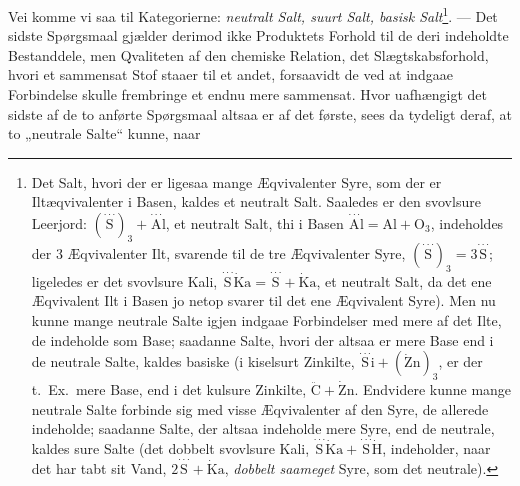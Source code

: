 \documentclass[12pt,a4paper]{book}
\begin{document}
Vei komme vi saa til Kategorierne: \emph{neutralt Salt,
suurt Salt, basisk Salt}\footnote{Det Salt, hvori der er ligesaa
mange Æqvivalenter Syre, som
der er Iltæqvivalenter i Basen, kaldes et neutralt Salt. Saaledes
er den svovlsure Leerjord:
$(\stackrel{\cdot\cdot\cdot}{\mathrm{S}})_3 +
\stackrel{\cdot\cdot\cdot}{\mathrm{A}}\mathrm{l}$, et neutralt Salt, thi
i Basen $\stackrel{\cdot\cdot\cdot}{\mathrm{A}}\mathrm{l} =
\mathrm{Al} + \mathrm{O}_3$, indeholdes der 3 Æqvivalenter Ilt,
svarende til de tre Æqvivalenter Syre,
$(\stackrel{\cdot\cdot\cdot}{\mathrm{S}})_3 =
3\stackrel{\cdot\cdot\cdot}{\mathrm{S}}$; ligeledes
er det svovlsure Kali,
$\stackrel{\cdot\cdot\cdot}{\mathrm{S}}\dot{\mathrm{K}}\mathrm{a} =
\stackrel{\cdot\cdot\cdot}{\mathrm{S}} + \dot{\mathrm{K}}\mathrm{a}$,
et neutralt Salt, da
det ene Æqvivalent Ilt i Basen jo netop svarer til det ene
Æqvivalent Syre). Men nu kunne mange neutrale Salte igjen
indgaae Forbindelser med mere af det Ilte, de indeholde som
Base; saadanne Salte, hvori der altsaa er mere Base end i de
neutrale Salte, kaldes basiske (i kiselsurt Zinkilte,
$\stackrel{\cdot\cdot\cdot}{\mathrm{S}}\mathrm{i} +
(\dot{\mathrm{Z}}\mathrm{n})_3$,
er der t.\ Ex.\ mere Base, end i det kulsure Zinkilte,
$\ddot{\mathrm{C}} + \dot{\mathrm{Z}}\mathrm{n}$.
Endvidere kunne mange neutrale Salte forbinde sig med visse
Æqvivalenter af den Syre, de allerede indeholde; saadanne Salte,
der altsaa indeholde mere Syre, end de neutrale, kaldes sure
Salte (det dobbelt svovlsure Kali,
$\stackrel{\cdot\cdot\cdot}{\mathrm{S}}\dot{\mathrm{K}}\mathrm{a} +
\stackrel{\cdot\cdot\cdot}{\mathrm{S}}\dot{\mathrm{H}}$,
indeholder,
naar det har tabt sit Vand,
$2\stackrel{\cdot\cdot\cdot}{\mathrm{S}} + \dot{\mathrm{K}}\mathrm{a}$,
\emph{dobbelt saameget} Syre,
som det neutrale).}. --- Det sidste Spørgsmaal
gjælder derimod ikke Produktets Forhold til de deri indeholdte
Bestanddele, men Qvaliteten af den chemiske Relation,
det Slægtskabsforhold, hvori et sammensat Stof staaer til et
andet, forsaavidt de ved at indgaae Forbindelse skulle frembringe
et endnu mere sammensat. Hvor uafhængigt det
sidste af de to anførte Spørgsmaal altsaa er af det første,
sees da tydeligt deraf, at to „neutrale Salte“ kunne, naar
\end{document}
